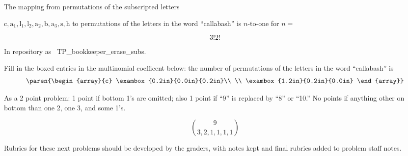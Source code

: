 \documentclass[quiz]{mcs}
\begin{document}
\begin{problem}

\bparts

\ppart 
The mapping from permutations of the subscripted letters
\iffalse
$\text{c}\,\text{a}_1\,\text{l}_1\,\text{l}_2\,\text{a}_2\,\text{b}\,\text{a}_3\,\text{s}\,\text{h}$
\fi
$\text{c},\text{a}_1,\text{l}_1,\text{l}_2,\text{a}_2,\text{b},\text{a}_3,\text{s},\text{h}$
  to permutations of the letters in the word ``callabash'' is
  $n$-to-one for $n=$\hfill \examrule[0.7in]

\begin{solution}
\[
3! 2!
\]
\end{solution}
\begin{staffnotes}
In repository as~ TP\_bookkeeper\_erase\_subs.
\end{staffnotes}

\ppart 
Fill in the boxed entries in the multinomial coefficent below: the
number of permutations of the letters in the word ``callabash'' is
\[
\paren{\begin{array}{c}
\exambox{0.2in}{0.0in}{0.2in}\\
\\
\exambox{1.2in}{0.2in}{0.0in}
\end{array}}
\]

\begin{staffnotes}
As a 2 point problem: 1 point if bottom 1's are omitted; also 1 point
if ``9'' is replaced by ``8'' or ``10.''  No points if anything other
on bottom than one 2, one 3, and some 1's.
\end{staffnotes}

\begin{solution}
\[
\binom{9}{3,2,1,1,1,1}
\]
\end{solution}

\eparts
\end{problem}





\examspace

\begin{staffnotes}
Rubrics for these next problems should be developed by the graders,
with notes kept and final rubrics added to problem staff notes.
\end{staffnotes}




\end{document}
